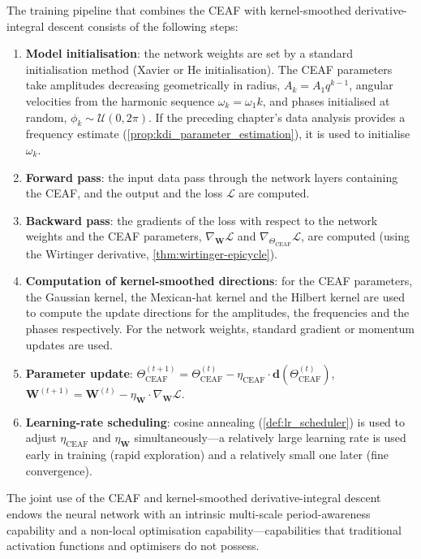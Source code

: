 \begin{definition}\label{def:eaf_kdi_pipeline}
The training pipeline that combines the CEAF with kernel-smoothed derivative-integral descent consists of the following steps:
\begin{enumerate}[label=(\roman*)]
    \item \textbf{Model initialisation}: the network weights are set by a standard initialisation method (Xavier or He initialisation). The CEAF parameters take amplitudes decreasing geometrically in radius, $A_k = A_1 q^{k-1}$, angular velocities from the harmonic sequence $\omega_k = \omega_1 k$, and phases initialised at random, $\phi_k \sim \mathcal{U}(0, 2\pi)$. If the preceding chapter's data analysis provides a frequency estimate (\cref{prop:kdi_parameter_estimation}), it is used to initialise $\omega_k$.
    \item \textbf{Forward pass}: the input data pass through the network layers containing the CEAF, and the output and the loss $\mathcal{L}$ are computed.
    \item \textbf{Backward pass}: the gradients of the loss with respect to the network weights and the CEAF parameters, $\nabla_{\mathbf{W}}\mathcal{L}$ and $\nabla_{\Theta_{\text{CEAF}}}\mathcal{L}$, are computed (using the Wirtinger derivative, \cref{thm:wirtinger-epicycle}).
    \item \textbf{Computation of kernel-smoothed directions}: for the CEAF parameters, the Gaussian kernel, the Mexican-hat kernel and the Hilbert kernel are used to compute the update directions for the amplitudes, the frequencies and the phases respectively. For the network weights, standard gradient or momentum updates are used.
    \item \textbf{Parameter update}: $\Theta_{\text{CEAF}}^{(t+1)} = \Theta_{\text{CEAF}}^{(t)} - \eta_{\text{CEAF}} \cdot \mathbf{d}(\Theta_{\text{CEAF}}^{(t)})$, $\mathbf{W}^{(t+1)} = \mathbf{W}^{(t)} - \eta_{\mathbf{W}} \cdot \nabla_{\mathbf{W}}\mathcal{L}$.
    \item \textbf{Learning-rate scheduling}: cosine annealing (\cref{def:lr_scheduler}) is used to adjust $\eta_{\text{CEAF}}$ and $\eta_{\mathbf{W}}$ simultaneously---a relatively large learning rate is used early in training (rapid exploration) and a relatively small one later (fine convergence).
\end{enumerate}
The joint use of the CEAF and kernel-smoothed derivative-integral descent endows the neural network with an intrinsic multi-scale period-awareness capability and a non-local optimisation capability---capabilities that traditional activation functions and optimisers do not possess.
\end{definition}

